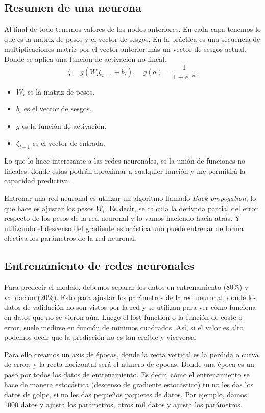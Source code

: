 \subsection{Resumen de una neurona}
Al final de todo tenemos valores de los nodos anteriores. En cada capa tenemos lo que es la matriz de pesos y el vector de sesgos. En la práctica es una secuencia de multiplicaciones matriz por el vector anterior más un vector de sesgos actual. Donde se aplica una función de activación no lineal. 
$$\zeta = g\left(W_i\zeta_{i-1} + b_i\right), \quad g(a)=\frac{1}{1+e^{-a}}.$$
\begin{itemize}
    \item $W_i$ es la matriz de pesos.
    \item $b_i$ es el vector de sesgos.
    \item $g$ es la función de activación.
    \item $\zeta_{i-1}$ es el vector de entrada.
\end{itemize}
Lo que lo hace interesante a las redes neuronales, es la unión de funciones no lineales, donde estas podrán aproximar a cualquier función y me permitirá la capacidad predictiva.

Entrenar una red neuronal es utilizar un algoritmo llamado \textit{Back-propogation}, lo que hace es ajustar los pesos $W_i$. Es decir, se calcula la derivada parcial del error respecto de los pesos de la red neuronal y lo vamos haciendo hacia atrás. Y utilizando el descenso del gradiente estocástica uno puede entrenar de forma efectiva los parámetros de la red neuronal.

\subsection{Entrenamiento de redes neuronales}
Para predecir el modelo, debemos separar los datos en entrenamiento ($80\%$) y validación ($20\%$). Esto para ajustar los parámetros de la red neuronal, donde los datos de validación no son vistos por la red y se utilizan para ver cómo funciona en datos que no se vieron aún. Luego el lost function o la función de coste o error, suele medirse en función de mínimos cuadrados. Así, si el valor es alto podemos decir que la predicción no es tan creíble y viceversa.

Para ello creamos un axis de épocas, donde la recta vertical es la perdida o curva de error, y la recta horizontal será el número de épocas. Donde una época es un paso por todos los datos de entrenamiento. Es decir, cómo el entrenamiento se hace de manera estocástica (descenso de gradiente estocástico) tu no les das los datos de golpe, si no les das pequeños paquetes de datos. Por ejemplo, damos 1000 datos y ajusta los parámetros, otros mil datos y ajusta los parámetros.

